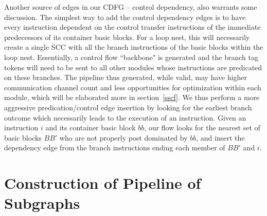 Another source of edges in our CDFG -- control dependency, also warrants some 
discussion. The simplest way to add the control dependency edges is to have
every instruction dependent on the control transfer instructions of the immediate
predecessors of its container basic blocks. For a loop nest, this will necessarily
create a single SCC with all the branch instructions of the basic blocks within the loop nest. Essentially, a control flow ``backbone" is generated and the branch
tag tokens will need to be sent to all other modules whose instructions are predicated on these branches. The pipeline thus generated, while valid, may
have higher communication channel count and less opportunities for optimization
within each module, which will be elaborated more in section~\ref{sscf}. We thus
perform a more aggressive predication/control edge insertion by looking for the
earliest branch outcome which necessarily leads to the execution of an instruction. Given an instruction $i$ and its container basic block $bb$, our
flow looks for the nearest set of basic blocks $BB'$ who are not properly post dominated by $bb$,
and insert the dependency edge from the branch instructions ending each member of $BB'$ and $i$.




\section{Construction of Pipeline of Subgraphs}
\label{sec:consp}


